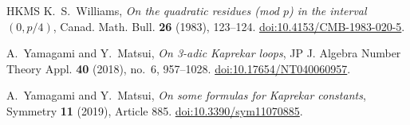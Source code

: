 \documentclass[11pt,reqno]{amsart}
\begin{document}
\begin{thebibliography}{HKMS}
K.~S.~Williams, \emph{On the quadratic residues (mod \(p\)) in the interval \((0,p/4)\)},
Canad. Math. Bull. \textbf{26} (1983), 123--124.
\href{https://doi.org/10.4153/CMB-1983-020-5}{doi:10.4153/CMB-1983-020-5}.

A.~Yamagami and Y.~Matsui, \emph{On 3-adic Kaprekar loops},
JP J. Algebra Number Theory Appl. \textbf{40} (2018), no.~6, 957--1028.
\href{https://doi.org/10.17654/NT040060957}{doi:10.17654/NT040060957}.

A.~Yamagami and Y.~Matsui, \emph{On some formulas for Kaprekar constants},
Symmetry \textbf{11} (2019), Article 885.
\href{https://doi.org/10.3390/sym11070885}{doi:10.3390/sym11070885}.

\end{thebibliography}\endgroup
\end{document}
